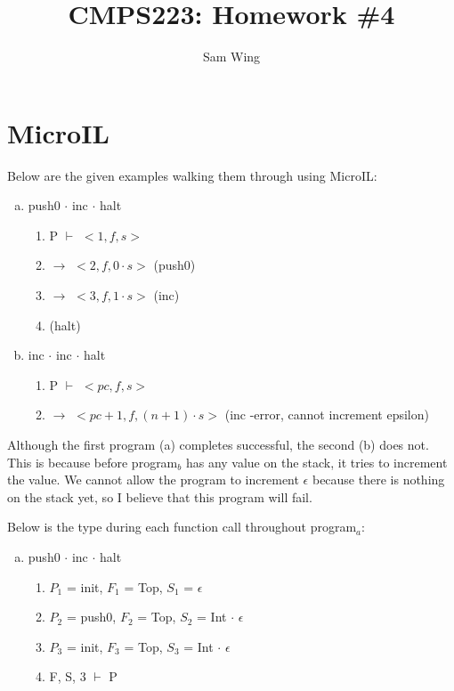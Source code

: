 \documentclass[11pt]{amsart}
\title{CMPS223: Homework \#4}
\author{Sam Wing}
\begin{document}
\maketitle
\section{MicroIL}

Below are the given examples walking them through using MicroIL:

\begin{enumerate}[a)]
	\item push0 $\cdot$ inc $\cdot$ halt
	\begin{enumerate}[1)]
		\item P $\vdash$ $< 1, f, s >$
		\item $\rightarrow$ $< 2, f, 0 \cdot s >$ (push0)
		\item $\rightarrow$ $< 3, f, 1 \cdot s >$ (inc)
		\item (halt)		
	\end{enumerate}
	
	\item inc $\cdot$ inc $\cdot$ halt
	\begin{enumerate}[1)]
		\item P $\vdash$ $< pc, f, s >$
		\item $\rightarrow$ $<pc + 1, f, (n + 1) \cdot s >$ (inc -error, cannot increment epsilon)
	\end{enumerate}
\end{enumerate}

Although the first program (a) completes successful, the second (b) does not.  This is because before program$_b$ has any value on the stack, it tries to increment the value.  We cannot allow the program to increment $\epsilon$ because there is nothing on the stack yet, so I believe that this program will fail.  

Below is the type during each function call throughout program$_a$:

\begin{enumerate}[a)]
	\item push0 $\cdot$ inc $\cdot$ halt
	\begin{enumerate}[1)]
		\item $P_1$ = init, $F_1$ = Top, $S_1$ = $\epsilon$	
		\item $P_2$ = push0, $F_2$ = Top, $S_2$ = Int $\cdot $  $\epsilon$
		\item $P_3$ = init, $F_3$ = Top, $S_3$ = Int $\cdot$ $\epsilon$
		\item F, S, 3 $\vdash$ P
	\end{enumerate}
\end{enumerate}
\end{document}

